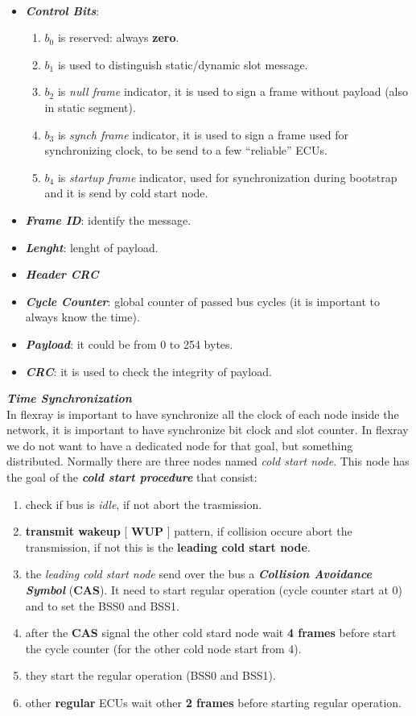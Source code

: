 \\
\begin{itemize}[nosep]
    \item \textbf{\textit{Control Bits}}:
    \begin{enumerate}[nosep]
        \item $b_0$ is reserved: always \textbf{zero}.
        \item $b_1$ is used to distinguish static/dynamic slot message.
        \item $b_2$ is \textit{null frame} indicator, it is used to sign a frame without payload (also in static segment).
        \item $b_3$ is \textit{synch frame} indicator, it is used to sign a frame used for synchronizing clock, to be send to a few ``reliable'' ECUs.
        \item $b_4$ is \textit{startup frame} indicator, used for synchronization during bootstrap and it is send by cold start node.
    \end{enumerate}
    \item \textbf{\textit{Frame ID}}: identify the message.
    \item \textbf{\textit{Lenght}}: lenght of payload.
    \item \textbf{\textit{Header CRC}}
    \item \textbf{\textit{Cycle Counter}}: global counter of passed bus cycles (it is important to always know the time).
    \item \textbf{\textit{Payload}}: it could be from 0 to 254 bytes.
    \item \textbf{\textit{CRC}}: it is used to check the integrity of payload.
\end{itemize}
\textbf{\textit{Time Synchronization}} \\
In flexray is important to have synchronize all the clock of each node inside the network, it is important to have synchronize bit clock and slot counter. In flexray we do not want to have a dedicated node for that goal, but something distributed. Normally there are three nodes named \textit{cold start node}. This node has the goal of the \textbf{\textit{cold start procedure}} that consist:
\begin{enumerate}[nosep]
    \item check if bus is \textit{idle}, if not abort the trasmission.
    \item \textbf{transmit wakeup} [ \textbf{WUP} ] pattern, if collision occure abort the transmission, if not this is the \textbf{leading cold start node}.
    \item the \textit{leading cold start node} send over the bus a \textbf{\textit{Collision Avoidance Symbol}} (\textbf{CAS}). It need to start regular operation (cycle counter start at 0) and to set the BSS0 and BSS1.
    \item after the \textbf{CAS} signal the other cold stard node wait \textbf{4 frames} before start the cycle counter (for the other cold node start from 4).
    \item they start the regular operation (BSS0 and BSS1).
    \item other \textbf{regular} ECUs wait other \textbf{2 frames} before starting regular operation.
\end{enumerate}
